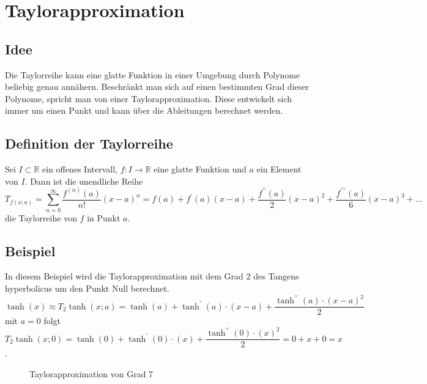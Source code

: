 %
%
%
\section{Taylorapproximation
\label{transfer:section:teil1}}
\subsection{Idee}
Die Taylorreihe kann eine glatte Funktion in einer Umgebung durch Polynome beliebig genau annähern. Beschränkt man sich auf einen bestimmten Grad dieser Polynome, spricht man von einer Taylorapproximation. Diese entwickelt sich immer um einen Punkt und kann über die Ableitungen berechnet werden.

\subsection{Definition der Taylorreihe}
Sei $I \subset \mathbb{R}$ ein offenes Intervall, $f: I \rightarrow \mathbb{R}$ eine glatte Funktion und $a$ ein Element von $I$. Dann ist die unendliche Reihe
\begin{equation}
	T_{f(x ; a)}=\sum_{n=0}^{\infty} \frac{f^{(n)}(a)}{n !}(x-a)^{n}=f(a)+f^{\prime}(a)(x-a)+\frac{f^{\prime \prime}(a)}{2}(x-a)^{2}+\frac{f^{\prime \prime \prime}(a)}{6}(x-a)^{3}+\ldots
\end{equation}
die Taylorreihe von $f$ in Punkt $a$.

\subsection{Beispiel}
In diesem Beispiel wird die Taylorapproximation mit dem Grad 2 des Tangens hyperbolicus um den Punkt Null berechnet.
$$
	\tanh(x) \approx T_{2} \tanh(x ; a)=\tanh(a)+\tanh^{\prime}(a) \cdot(x-a)+\frac{\tanh^{\prime \prime}(a) \cdot(x-a)^{2}}{2}
$$
mit $a = 0$ folgt
$$
	T_{2} \tanh(x ; 0)=\tanh(0)+\tanh^{\prime}(0) \cdot(x)+\frac{\tanh^{\prime \prime}(0) \cdot(x)^{2}}{2} = 0 + x + 0 = x
$$.

\begin{figure}
\centering
{}
\caption{Taylorapproximation von Grad 7
\label{motivation:figure:Taylor}}
\end{figure}

